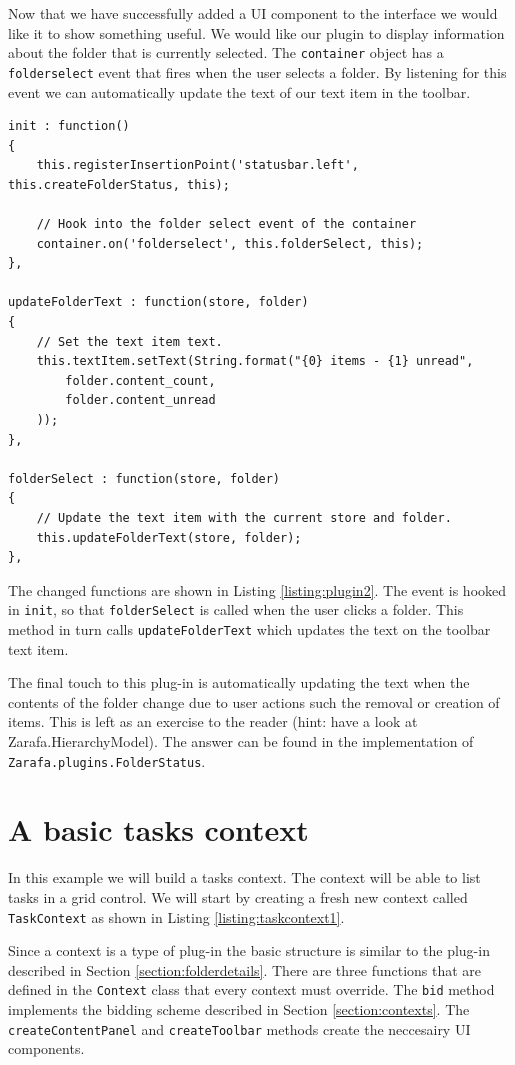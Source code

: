 Now that we have successfully added a UI component to the interface we would like it to show something
useful. We would like our plugin to display information about the folder that is currently selected.
The {\tt container} object has a {\tt folderselect} event that fires when the user selects a folder.
By listening for this event we can automatically update the text of our text item in the toolbar.

\begin{lstlisting}[caption={Attaching an event handler to the container.}, label=listing:plugin2]
init : function()
{
	this.registerInsertionPoint('statusbar.left', this.createFolderStatus, this);
	
	// Hook into the folder select event of the container
	container.on('folderselect', this.folderSelect, this);
},

updateFolderText : function(store, folder)
{
	// Set the text item text.
	this.textItem.setText(String.format("{0} items - {1} unread",
		folder.content_count,
		folder.content_unread
	));
},

folderSelect : function(store, folder)
{
	// Update the text item with the current store and folder.
	this.updateFolderText(store, folder);
},
\end{lstlisting}

The changed functions are shown in Listing \ref{listing:plugin2}. The event is hooked in {\tt init}, so that
{\tt folderSelect} is called when the user clicks a folder. This method in turn calls {\tt updateFolderText}
which updates the text on the toolbar text item.

The final touch to this plug-in is automatically updating the text when the contents of the folder change due
to user actions such the removal or creation of items. This is left as an exercise to the reader (hint: have
a look at Zarafa.HierarchyModel). The answer can be found in the implementation of 
{\tt Zarafa.plugins.FolderStatus}.

\section{A basic tasks context}
\label{section:taskscontext}

In this example we will build a tasks context. The context will be able to list tasks in a grid control.
We will start by creating a fresh new context called {\tt TaskContext} as shown in Listing 
\ref{listing:taskcontext1}.

Since a context is a type of plug-in the basic structure is similar to the plug-in described in Section
\ref{section:folderdetails}. There are three functions that are defined in the {\tt Context} class 
that every context must override. The {\tt bid} method implements the bidding scheme described in 
Section \ref{section:contexts}. The {\tt createContentPanel} and {\tt createToolbar} methods create 
the neccesairy UI components. 

